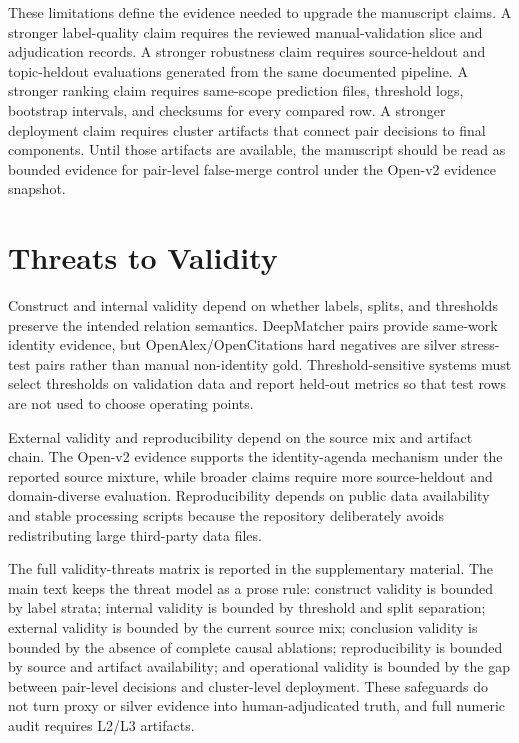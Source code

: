 \documentclass[11pt]{article}
\begin{document}
These limitations define the evidence needed to upgrade the manuscript claims. A stronger label-quality claim requires the reviewed manual-validation slice and adjudication records. A stronger robustness claim requires source-heldout and topic-heldout evaluations generated from the same documented pipeline. A stronger ranking claim requires same-scope prediction files, threshold logs, bootstrap intervals, and checksums for every compared row. A stronger deployment claim requires cluster artifacts that connect pair decisions to final components. Until those artifacts are available, the manuscript should be read as bounded evidence for pair-level false-merge control under the Open-v2 evidence snapshot.

\section{Threats to Validity}

Construct and internal validity depend on whether labels, splits, and thresholds preserve the intended relation semantics. DeepMatcher pairs provide same-work identity evidence, but OpenAlex/OpenCitations hard negatives are silver stress-test pairs rather than manual non-identity gold. Threshold-sensitive systems must select thresholds on validation data and report held-out metrics so that test rows are not used to choose operating points.

External validity and reproducibility depend on the source mix and artifact chain. The Open-v2 evidence supports the identity-agenda mechanism under the reported source mixture, while broader claims require more source-heldout and domain-diverse evaluation. Reproducibility depends on public data availability and stable processing scripts because the repository deliberately avoids redistributing large third-party data files.

The full validity-threats matrix is reported in the supplementary material. The main text keeps the threat model as a prose rule: construct validity is bounded by label strata; internal validity is bounded by threshold and split separation; external validity is bounded by the current source mix; conclusion validity is bounded by the absence of complete causal ablations; reproducibility is bounded by source and artifact availability; and operational validity is bounded by the gap between pair-level decisions and cluster-level deployment. These safeguards do not turn proxy or silver evidence into human-adjudicated truth, and full numeric audit requires L2/L3 artifacts.
\end{document}
